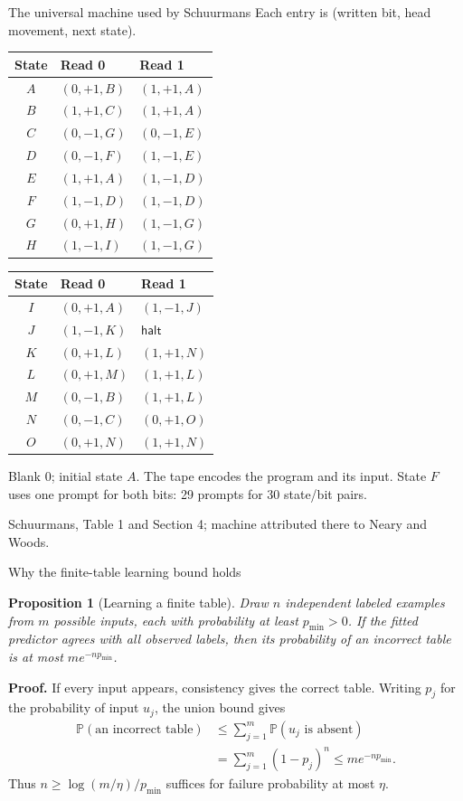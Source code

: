 \documentclass[11pt,aspectratio=169]{beamer}
\renewcommand{\P}{\mathbb P}
\newcommand{\halt}{\mathsf{halt}}
\newcommand{\source}[1]{\par\vfill{\scriptsize\color{muted}#1\par}}
\newtheorem{proposition}{Proposition}
\begin{document}
\begin{frame}{The universal machine used by Schuurmans}
Each entry is (written bit, head movement, next state).
\small
\begin{center}
\begin{tabular}{@{}cll@{}}
\toprule
State & Read 0 & Read 1\\
\midrule
$A$ & $(0,+1,B)$ & $(1,+1,A)$\\
$B$ & $(1,+1,C)$ & $(1,+1,A)$\\
$C$ & $(0,-1,G)$ & $(0,-1,E)$\\
$D$ & $(0,-1,F)$ & $(1,-1,E)$\\
$E$ & $(1,+1,A)$ & $(1,-1,D)$\\
$F$ & $(1,-1,D)$ & $(1,-1,D)$\\
$G$ & $(0,+1,H)$ & $(1,-1,G)$\\
$H$ & $(1,-1,I)$ & $(1,-1,G)$\\
\bottomrule
\end{tabular}
\hspace{12mm}
\begin{tabular}{@{}cll@{}}
\toprule
State & Read 0 & Read 1\\
\midrule
$I$ & $(0,+1,A)$ & $(1,-1,J)$\\
$J$ & $(1,-1,K)$ & $\halt$\\
$K$ & $(0,+1,L)$ & $(1,+1,N)$\\
$L$ & $(0,+1,M)$ & $(1,+1,L)$\\
$M$ & $(0,-1,B)$ & $(1,+1,L)$\\
$N$ & $(0,-1,C)$ & $(0,+1,O)$\\
$O$ & $(0,+1,N)$ & $(1,+1,N)$\\
\bottomrule
\end{tabular}
\end{center}
\normalsize
Blank $0$; initial state $A$. The tape encodes the program and its input.
State $F$ uses one prompt for both bits: 29 prompts for 30 state/bit pairs.
\source{Schuurmans, Table 1 and Section 4; machine attributed there to Neary and Woods.}
\end{frame}

\begin{frame}{Why the finite-table learning bound holds}
\begin{proposition}[Learning a finite table]
Draw $n$ independent labeled examples from $m$ possible inputs, each with
probability at least $p_{\min}>0$. If the fitted predictor agrees with all
observed labels, then its probability of an incorrect table is at most
$m e^{-np_{\min}}$.
\end{proposition}
\textbf{Proof.} If every input appears, consistency gives the correct table.
Writing $p_j$ for the probability of input $u_j$, the union bound gives
\[
\begin{aligned}
 \P(\text{an incorrect table})
 &\le\sum_{j=1}^m\P(u_j\text{ is absent})\\
 &=\sum_{j=1}^m(1-p_j)^n\le m e^{-np_{\min}}.
\end{aligned}
\]
Thus $n\ge \log(m/\eta)/p_{\min}$ suffices for failure probability at most $\eta$.
\end{frame}
\end{document}

